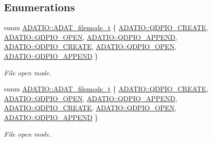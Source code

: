 \subsection*{Enumerations}
\begin{DoxyCompactItemize}
\item 
enum \mbox{\hyperlink{group__qio_ga669520ca9003997be838730beef322b4}{A\+D\+A\+T\+I\+O\+::\+A\+D\+A\+T\+\_\+filemode\+\_\+t}} \{ \newline
\mbox{\hyperlink{group__qio_gga669520ca9003997be838730beef322b4a977eb79b8f4ae7cfd75c9dbcc992b84f}{A\+D\+A\+T\+I\+O\+::\+Q\+D\+P\+I\+O\+\_\+\+C\+R\+E\+A\+TE}}, 
\mbox{\hyperlink{group__qio_gga669520ca9003997be838730beef322b4a6dd4c4da4f92babb9ab4c28f4aa13231}{A\+D\+A\+T\+I\+O\+::\+Q\+D\+P\+I\+O\+\_\+\+O\+P\+EN}}, 
\mbox{\hyperlink{group__qio_gga669520ca9003997be838730beef322b4aae9e16570c37ba9ace5529d3bc48b9a8}{A\+D\+A\+T\+I\+O\+::\+Q\+D\+P\+I\+O\+\_\+\+A\+P\+P\+E\+ND}}, 
\mbox{\hyperlink{group__qio_gga669520ca9003997be838730beef322b4a977eb79b8f4ae7cfd75c9dbcc992b84f}{A\+D\+A\+T\+I\+O\+::\+Q\+D\+P\+I\+O\+\_\+\+C\+R\+E\+A\+TE}}, 
\newline
\mbox{\hyperlink{group__qio_gga669520ca9003997be838730beef322b4a6dd4c4da4f92babb9ab4c28f4aa13231}{A\+D\+A\+T\+I\+O\+::\+Q\+D\+P\+I\+O\+\_\+\+O\+P\+EN}}, 
\mbox{\hyperlink{group__qio_gga669520ca9003997be838730beef322b4aae9e16570c37ba9ace5529d3bc48b9a8}{A\+D\+A\+T\+I\+O\+::\+Q\+D\+P\+I\+O\+\_\+\+A\+P\+P\+E\+ND}}
 \}
\begin{DoxyCompactList}\small\item\em File open mode. \end{DoxyCompactList}\item 
enum \mbox{\hyperlink{group__qio_ga669520ca9003997be838730beef322b4}{A\+D\+A\+T\+I\+O\+::\+A\+D\+A\+T\+\_\+filemode\+\_\+t}} \{ \newline
\mbox{\hyperlink{group__qio_gga669520ca9003997be838730beef322b4a977eb79b8f4ae7cfd75c9dbcc992b84f}{A\+D\+A\+T\+I\+O\+::\+Q\+D\+P\+I\+O\+\_\+\+C\+R\+E\+A\+TE}}, 
\mbox{\hyperlink{group__qio_gga669520ca9003997be838730beef322b4a6dd4c4da4f92babb9ab4c28f4aa13231}{A\+D\+A\+T\+I\+O\+::\+Q\+D\+P\+I\+O\+\_\+\+O\+P\+EN}}, 
\mbox{\hyperlink{group__qio_gga669520ca9003997be838730beef322b4aae9e16570c37ba9ace5529d3bc48b9a8}{A\+D\+A\+T\+I\+O\+::\+Q\+D\+P\+I\+O\+\_\+\+A\+P\+P\+E\+ND}}, 
\mbox{\hyperlink{group__qio_gga669520ca9003997be838730beef322b4a977eb79b8f4ae7cfd75c9dbcc992b84f}{A\+D\+A\+T\+I\+O\+::\+Q\+D\+P\+I\+O\+\_\+\+C\+R\+E\+A\+TE}}, 
\newline
\mbox{\hyperlink{group__qio_gga669520ca9003997be838730beef322b4a6dd4c4da4f92babb9ab4c28f4aa13231}{A\+D\+A\+T\+I\+O\+::\+Q\+D\+P\+I\+O\+\_\+\+O\+P\+EN}}, 
\mbox{\hyperlink{group__qio_gga669520ca9003997be838730beef322b4aae9e16570c37ba9ace5529d3bc48b9a8}{A\+D\+A\+T\+I\+O\+::\+Q\+D\+P\+I\+O\+\_\+\+A\+P\+P\+E\+ND}}
 \}
\begin{DoxyCompactList}\small\item\em File open mode. \end{DoxyCompactList}\end{DoxyCompactItemize}

